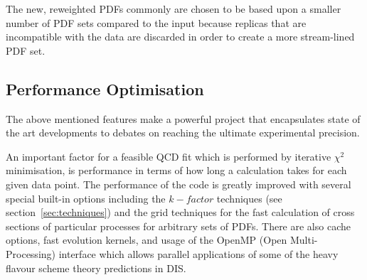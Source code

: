 The new, reweighted PDFs commonly are chosen to be based upon a smaller number of PDF sets compared to the input because replicas 
that are incompatible with the data are discarded in order to create a more stream-lined PDF set.



\subsection{Performance Optimisation}

The above mentioned features make \fitter a powerful project that encapsulates 
state of the art developments 
to debates on reaching the ultimate experimental precision. 

An important factor for a feasible QCD fit which is performed by iterative 
$\chi^2$ minimisation, is performance in terms of how long a calculation takes for each given data point.
The performance of the \fitter code is greatly improved with several special built-in options
including the $k-factor$ techniques (see section~\ref{sec:techniques}) and the grid techniques for the fast calculation of cross 
sections of particular processes for arbitrary sets of PDFs. There are also cache options, fast evolution kernels, and 
usage of the OpenMP (Open Multi-Processing) interface which allows
parallel applications of some of the heavy flavour scheme theory predictions in DIS. 






